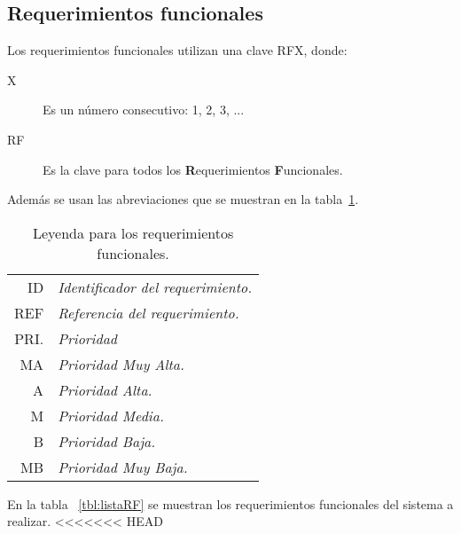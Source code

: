 \subsection{Requerimientos funcionales}
	Los requerimientos funcionales utilizan una clave RFX, donde:
        
\begin{description}
        \item[X] Es un número consecutivo: 1, 2, 3, ...
        \item[RF] Es la clave para todos los {\bf R}equerimientos {\bf F}uncionales.
\end{description}

	Además se usan las abreviaciones que se muestran en la tabla~\ref{tbl:leyendaRF}.
\begin{table}[hbtp!]
        \begin{center}
    \begin{tabular}{|r l|}
            \hline
        {\footnotesize ID} & {\footnotesize\em Identificador del requerimiento.}\\
        {\footnotesize REF} & {\footnotesize\em Referencia del requerimiento.}\\
        {\footnotesize PRI.} & {\footnotesize\em Prioridad}\\
        {\footnotesize MA} & {\footnotesize\em Prioridad Muy Alta.}\\
        {\footnotesize A} & {\footnotesize\em Prioridad Alta.}\\
        {\footnotesize M} & {\footnotesize\em Prioridad Media.}\\
        {\footnotesize B} & {\footnotesize\em Prioridad Baja.}\\
        {\footnotesize MB} & {\footnotesize\em Prioridad Muy Baja.}\\
                \hline
    \end{tabular} 
    \caption{Leyenda para los requerimientos funcionales.}
    \label{tbl:leyendaRF}
        \end{center}
\end{table}
En la tabla ~\ref{tbl:listaRF} se muestran los requerimientos funcionales del sistema a realizar.
<<<<<<< HEAD

